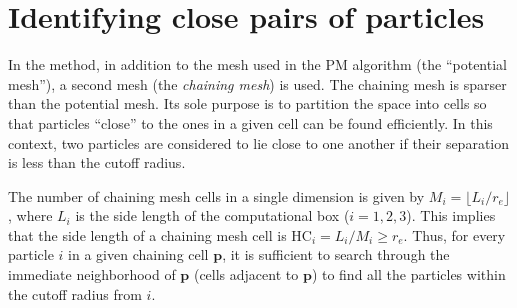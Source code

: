 \section{Identifying close pairs of particles}
In the \PThreeM{} method, in addition to the mesh used in the PM algorithm (the ``potential mesh''), a second mesh (the \textit{chaining mesh}) is used.
The chaining mesh is sparser than the potential mesh.
Its sole purpose is to partition the space into cells so that particles ``close'' to the ones in a given cell can be found efficiently.
In this context, two particles are considered to lie close to one another if their separation is less than the cutoff radius.

The number of chaining mesh cells in a single dimension is given by $M_i = \lfloor L_i / r_e \rfloor$, where $L_i$ is the side length of the computational box ($i=1,2,3$).
This implies that the side length of a chaining mesh cell is $\text{HC}_i = L_i / M_i \geq r_e$.
Thus, for every particle $i$ in a given chaining cell $\mathbf{p}$, it is sufficient to search through the immediate neighborhood of $\mathbf{p}$ (cells adjacent to $\mathbf{p}$) to find all the particles within the cutoff radius from $i$.

